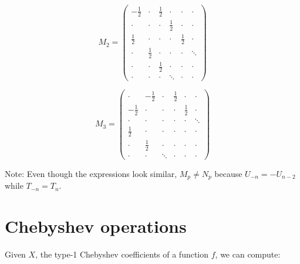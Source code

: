 \documentclass{article}
\begin{document}
\begin{equation*}
\renewcommand*{\arraystretch}{1.2}
M_2 =
\begin{pmatrix}
-\frac{1}{2} & \cdot & \frac{1}{2} & \cdot & \cdot & \cdot \\
\cdot & \cdot & \cdot & \frac{1}{2} & \cdot & \cdot \\
\frac{1}{2} & \cdot & \cdot & \cdot & \frac{1}{2} & \cdot \\
\cdot & \frac{1}{2} & \cdot & \cdot & \cdot & \ddots \\
\cdot & \cdot & \frac{1}{2} & \cdot & \cdot & \cdot \\
\cdot & \cdot & \cdot & \ddots & \cdot & \cdot
\end{pmatrix}
\end{equation*}

\begin{equation*}
\renewcommand*{\arraystretch}{1.2}
M_3 =
\begin{pmatrix}
\cdot & -\frac{1}{2} & \cdot & \frac{1}{2} & \cdot & \cdot \\
-\frac{1}{2} & \cdot & \cdot & \cdot & \frac{1}{2} & \cdot \\
\cdot & \cdot & \cdot & \cdot & \cdot & \ddots \\
\frac{1}{2} & \cdot & \cdot & \cdot & \cdot & \cdot \\
\cdot & \frac{1}{2} & \cdot & \cdot & \cdot & \cdot \\
\cdot & \cdot & \ddots & \cdot & \cdot & \cdot
\end{pmatrix}
\end{equation*}

Note: Even though the expressions look similar, $M_p \neq N_p$ because $U_{-n} = -U_{n-2}$ while $T_{-n} = T_n$.

\section{Chebyshev operations}

Given $X$, the type-1 Chebyshev coefficients of a function $f$, we can compute:
\end{document}
